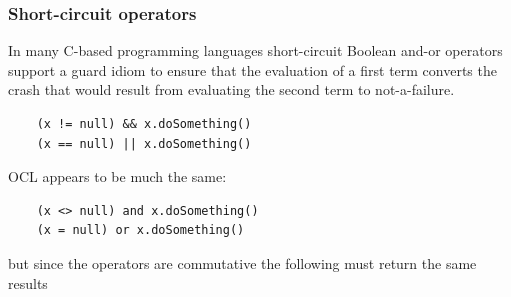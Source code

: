\documentclass{jot}
\begin{document}







\subsubsection{Short-circuit operators}

In many C-based programming languages short-circuit Boolean and-or operators support a guard idiom to ensure that the evaluation of a first term converts the crash that would result from evaluating the second term to not-a-failure.

\begin{verbatim}
    (x != null) && x.doSomething()
    (x == null) || x.doSomething()
\end{verbatim}

OCL appears to be much the same:

\begin{verbatim}
    (x <> null) and x.doSomething()
    (x = null) or x.doSomething()
\end{verbatim}

but since the operators are commutative the following must return the same results 
\end{document}
